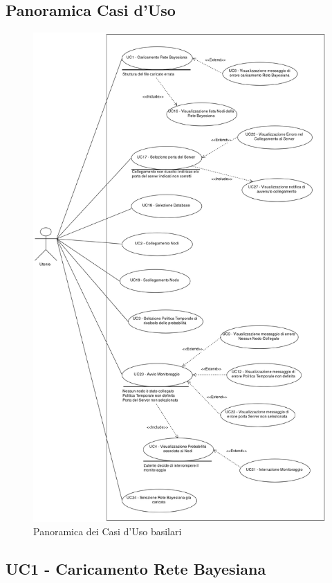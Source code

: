 \subsection{Panoramica Casi d'Uso}\label{PanoramicaUC}
\begin{figure}[H]
	\begin{center}
		\includegraphics[scale=0.18]{./images/VistaUC.png}
		 \caption{Panoramica dei Casi d'Uso basilari}	
	\end{center}
\end{figure}

\pagebreak
\subsection{UC1 - Caricamento Rete Bayesiana}\label{UC1}

